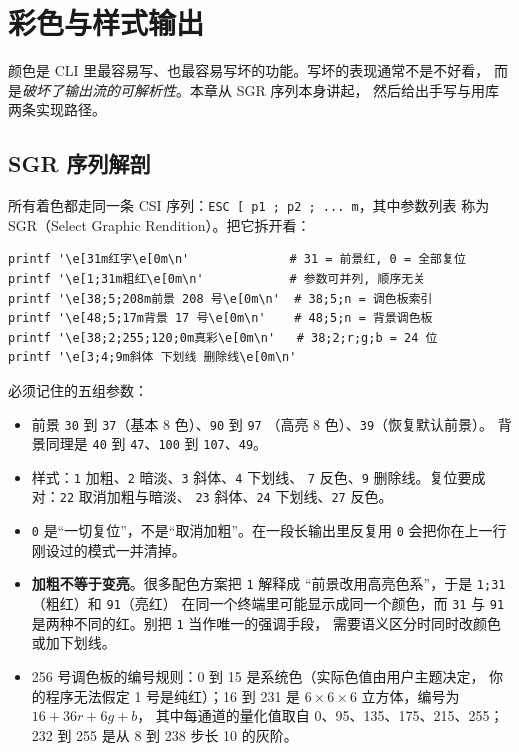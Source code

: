 \documentclass[12pt,a4paper,fontset=fandol]{ctexbook}
\newcommand{\Tp}[1]{\texttt{#1}}
\begin{document}
\chapter{彩色与样式输出}

颜色是 CLI 里最容易写、也最容易写坏的功能。写坏的表现通常不是不好看，
而是\emph{破坏了输出流的可解析性}。本章从 SGR 序列本身讲起，
然后给出手写与用库两条实现路径。

\section{SGR 序列解剖}

所有着色都走同一条 CSI 序列：\Tp{ESC [ p1 ; p2 ; ... m}，其中参数列表
称为 SGR（Select Graphic Rendition）。把它拆开看：

\begin{lstlisting}[style=shellstyle,caption={SGR 参数的四种常用形态}]
printf '\e[31m红字\e[0m\n'              # 31 = 前景红, 0 = 全部复位
printf '\e[1;31m粗红\e[0m\n'            # 参数可并列, 顺序无关
printf '\e[38;5;208m前景 208 号\e[0m\n'  # 38;5;n = 调色板索引
printf '\e[48;5;17m背景 17 号\e[0m\n'    # 48;5;n = 背景调色板
printf '\e[38;2;255;120;0m真彩\e[0m\n'   # 38;2;r;g;b = 24 位
printf '\e[3;4;9m斜体 下划线 删除线\e[0m\n'
\end{lstlisting}

必须记住的五组参数：

\begin{itemize}
\item 前景 \Tp{30} 到 \Tp{37}（基本 8 色）、\Tp{90} 到 \Tp{97}
      （高亮 8 色）、\Tp{39}（恢复默认前景）。
      背景同理是 \Tp{40} 到 \Tp{47}、\Tp{100} 到 \Tp{107}、\Tp{49}。
\item 样式：\Tp{1} 加粗、\Tp{2} 暗淡、\Tp{3} 斜体、\Tp{4} 下划线、
      \Tp{7} 反色、\Tp{9} 删除线。复位要成对：\Tp{22} 取消加粗与暗淡、
      \Tp{23} 斜体、\Tp{24} 下划线、\Tp{27} 反色。
\item \Tp{0} 是``一切复位''，不是``取消加粗''。在一段长输出里反复用
      \Tp{0} 会把你在上一行刚设过的模式一并清掉。
\item \textbf{加粗不等于变亮}。很多配色方案把 \Tp{1} 解释成
      ``前景改用高亮色系''，于是 \Tp{1;31}（粗红）和 \Tp{91}（亮红）
      在同一个终端里可能显示成同一个颜色，而 \Tp{31} 与 \Tp{91}
      是两种不同的红。别把 \Tp{1} 当作唯一的强调手段，
      需要语义区分时同时改颜色或加下划线。
\item 256 号调色板的编号规则：0 到 15 是系统色（实际色值由用户主题决定，
      你的程序无法假定 1 号是纯红）；16 到 231 是
      \(6\times6\times6\) 立方体，编号为 \(16+36r+6g+b\)，
      其中每通道的量化值取自 0、95、135、175、215、255；
      232 到 255 是从 8 到 238 步长 10 的灰阶。
\end{itemize}
\end{document}
